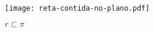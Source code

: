 \begin{figure}[h]
    \centering
    \caption{$r \subset \pi$}
    \texttt{[image: reta-contida-no-plano.pdf]}
\end{figure}

